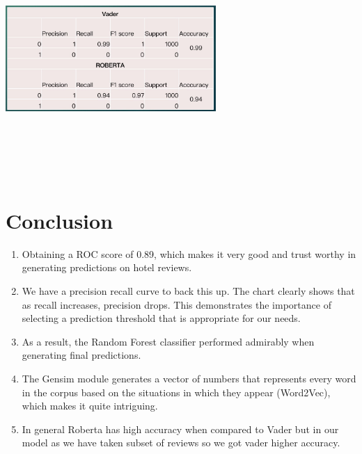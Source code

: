 \includegraphics[width=8cm, height=9cm ]{vader_roberta.jpeg}
\section{Conclusion}
\begin{enumerate}
    \item Obtaining a ROC score of 0.89, which makes it very good and trust worthy in generating predictions on hotel reviews.
    \item We have a precision recall curve to back this up. The chart clearly shows that as recall increases, precision drops. This demonstrates the importance of selecting a prediction threshold that is appropriate for our needs.
    \item As a result, the Random Forest classifier performed admirably when generating final predictions.
    \item The Gensim module generates a vector of numbers that represents every word in the corpus based on the situations in which they appear (Word2Vec), which makes it quite intriguing.
    \item In general Roberta has high accuracy when compared to Vader but in our model as we have taken subset of reviews so we got vader higher accuracy.
    
    
\end{enumerate}


